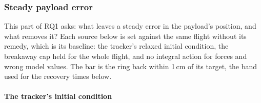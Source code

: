 
\subsubsection{Steady payload error}
\label{sec:res_steady}

This part of RQ1 asks: what leaves a steady error in the payload's position, and what removes it?
Each source below is set against the same flight without its remedy, which is its baseline: the tracker's
relaxed initial condition, the breakaway cap held for the whole flight, and no integral action for forces
and wrong model values. The bar is the ring back within 1\,cm of its target, the band used for the
recovery times below.

\paragraph{The tracker's initial condition}
\label{sec:res_ic}

